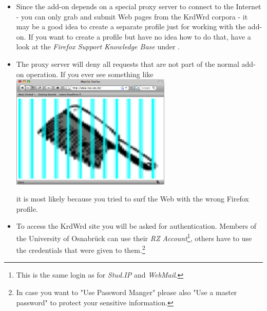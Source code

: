 \documentclass[12pt,a4paper]{article}
\begin{document}
\begin{itemize}
\item Since the add-on depends on a special proxy server to connect to the Internet - you can only grab and submit Web pages from the KrdWrd corpora - it may be a good idea to create a separate profile just for working with the add-on. If you want to create a profile but have no idea how to do that, have a look at the \emph{Firefox Support Knowledge Base} under . \\
%

\item The proxy server will deny all requests that are not part of the normal add-on operation. If you ever see something like \\

\includegraphics[width=0.6\textwidth]{images/blocked.png}
\medskip

it is most likely because you tried to surf the Web with the wrong Firefox profile. \\

\item To access the KrdWrd site you will be asked for authentication. Members of the University of Osnabr\"{u}ck can use their \emph{RZ Account}\footnote{This is the same login as for \emph{Stud.IP} and \emph{WebMail}.}, others have to use the credentials that were given to them.\footnote{In case you want to "Use Password Manger" please also "Use a master password" to protect your sensitive information.} \\


\end{itemize}
\end{document}
